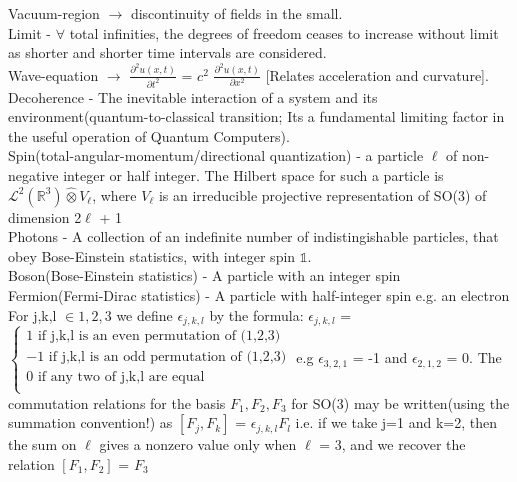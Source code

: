 \documentclass[10pt,fancy]{elegantbook}
\begin{document}
{\begin{definition}
Vacuum-region $\rightarrow$ discontinuity of fields in the small. \\ 

Limit - $\forall$ total infinities, the degrees of freedom ceases to increase
without limit as shorter and shorter time intervals are considered. \\

Wave-equation $\longrightarrow$ $\frac{\partial^2u(x,t)}{\partial t^2}$ = $c^2$ $\frac{\partial^2 u(x,t)}{\partial x^2}$  [Relates acceleration and curvature]. \\
  
Decoherence - The inevitable interaction of a system and its environment(quantum-to-classical transition; Its a fundamental limiting factor in the useful operation of Quantum Computers).  \\
                                                                         
Spin(total-angular-momentum/directional quantization) - a particle $\ell$ of non-negative integer or half integer. The Hilbert space for such a particle is
$\mathscr L^2(\mathbb R^3) \hat \otimes V_{\ell}$, where $V_{\ell}$ is an irreducible projective representation of SO(3)
of dimension 2$\ell$ + 1  \\

Photons - A collection of an indefinite number of indistingishable particles, that obey Bose-Einstein statistics, with integer spin $\mathbb 1$.  \\

Boson(Bose-Einstein statistics) - A particle with an integer spin  \\

Fermion(Fermi-Dirac statistics) - A particle with half-integer spin e.g. an electron  
For j,k,l $\in {1,2,3}$ we define $\epsilon_{j,k,l}$ by the formula:  
$\epsilon_{j,k,l}$ = $\left\{ 
\begin{array}{ll}
   1 \text{ if {j,k,l} is an even permutation of (1,2,3)} \\ 
  -1 \text{ if {j,k,l} is  an odd permutation of (1,2,3)} \\
   0 \text{ if any two of {j,k,l} are equal} \\
\end{array}
\right.$ e.g $\epsilon_{3,2,1}$ = -1 and $\epsilon _{2,1,2}$ = 0. 
The commutation relations for the basis ${F_1,F_2,F_3}$ for SO(3)  
may be written(using the summation convention!) as
$[F_j,F_k]$ = $\epsilon_{j,k,l}F_l$ i.e. if we take j=1 and k=2, then the sum on $\ell$
gives a nonzero value only when $\ell$ = 3, and we recover the relation $[F_1,F_2]$ = $F_3$ \\
 

\end{definition}}
\end{document}
